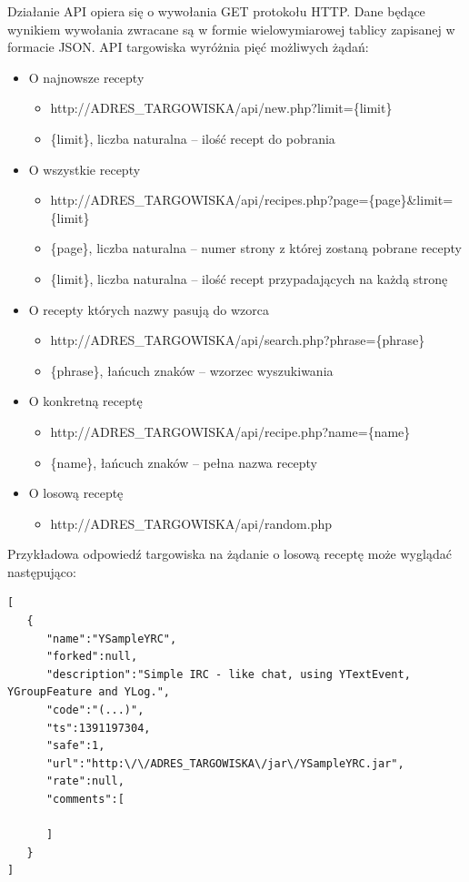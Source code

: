 \documentclass[11pt,a4paper,polish,thesis]{dcsbook}
\begin{document}
Działanie API opiera się o wywołania GET protokołu HTTP. Dane będące wynikiem wywołania zwracane są w formie wielowymiarowej tablicy zapisanej w formacie JSON. API
targowiska wyróżnia pięć możliwych żądań:
\begin{itemize}
\item O najnowsze recepty
\begin{itemize}
\item http://ADRES\_TARGOWISKA/api/new.php?limit=\{limit\}
\item \{limit\}, liczba naturalna -- ilość recept do pobrania
\end{itemize}
\item O wszystkie recepty
\begin{itemize}
\item http://ADRES\_TARGOWISKA/api/recipes.php?page=\{page\}\&limit=\{limit\}
\item \{page\}, liczba naturalna -- numer strony z której zostaną pobrane recepty
\item \{limit\}, liczba naturalna -- ilość recept przypadających na każdą stronę
\end{itemize}
\item O recepty których nazwy pasują do wzorca
\begin{itemize}
\item http://ADRES\_TARGOWISKA/api/search.php?phrase=\{phrase\}
\item \{phrase\}, łańcuch znaków -- wzorzec wyszukiwania
\end{itemize}
\item O konkretną receptę
\begin{itemize}
\item http://ADRES\_TARGOWISKA/api/recipe.php?name=\{name\}
\item \{name\}, łańcuch znaków -- pełna nazwa recepty
\end{itemize}
\item O losową receptę
\begin{itemize}
\item http://ADRES\_TARGOWISKA/api/random.php
\end{itemize}
\end{itemize}
Przykładowa odpowiedź targowiska na żądanie o losową receptę może wyglądać następująco:
\begin{verbatim}
[
   {
      "name":"YSampleYRC",
      "forked":null,
      "description":"Simple IRC - like chat, using YTextEvent, YGroupFeature and YLog.",
      "code":"(...)",
      "ts":1391197304,
      "safe":1,
      "url":"http:\/\/ADRES_TARGOWISKA\/jar\/YSampleYRC.jar",
      "rate":null,
      "comments":[

      ]
   }
]
\end{verbatim}
\end{document}

